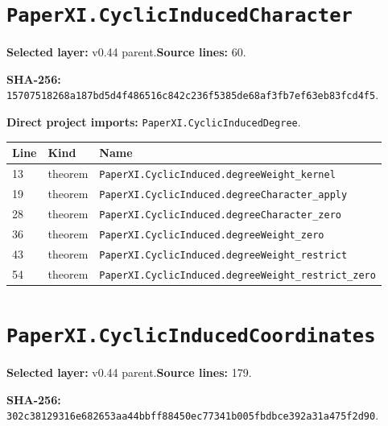 \documentclass[10pt,oneside]{book}
\begin{document}
\section{\texorpdfstring{\nolinkurl{PaperXI.CyclicInducedCharacter}}{PaperXI.CyclicInducedCharacter}}\label{module:PaperXI.CyclicInducedCharacter}

\textbf{Selected layer:} v0.44 parent.\quad\textbf{Source lines:} 60.\par\textbf{SHA-256:} {\scriptsize\nolinkurl{15707518268a187bd5d4f486516c842c236f5385de68af3fb7ef63eb83fcd4f5}}.


\textbf{Direct project imports:} \nolinkurl{PaperXI.CyclicInducedDegree}.

\begin{longtable}{@{}p{}p{}p{}@{}}\toprule Line&Kind&Name\\\midrule\endhead

13&theorem&\nolinkurl{PaperXI.CyclicInduced.degreeWeight_kernel}\\

19&theorem&\nolinkurl{PaperXI.CyclicInduced.degreeCharacter_apply}\\

28&theorem&\nolinkurl{PaperXI.CyclicInduced.degreeCharacter_zero}\\

36&theorem&\nolinkurl{PaperXI.CyclicInduced.degreeWeight_zero}\\

43&theorem&\nolinkurl{PaperXI.CyclicInduced.degreeWeight_restrict}\\

54&theorem&\nolinkurl{PaperXI.CyclicInduced.degreeWeight_restrict_zero}\\

\bottomrule\end{longtable}

\section{\texorpdfstring{\nolinkurl{PaperXI.CyclicInducedCoordinates}}{PaperXI.CyclicInducedCoordinates}}\label{module:PaperXI.CyclicInducedCoordinates}

\textbf{Selected layer:} v0.44 parent.\quad\textbf{Source lines:} 179.\par\textbf{SHA-256:} {\scriptsize\nolinkurl{302c38129316e682653aa44bbff88450ec77341b005fbdbce392a31a475f2d90}}.
\end{document}
